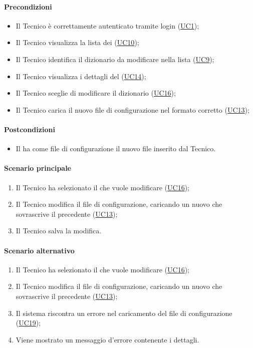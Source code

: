 \paragraph*{Precondizioni}
\begin{itemize}
  \item Il Tecnico è correttamente autenticato tramite login (\hyperref[UC1]{UC1});
  \item Il Tecnico visualizza la lista dei  (\hyperref[UC10]{UC10});
  \item Il Tecnico identifica il dizionario da modificare nella lista (\hyperref[UC9]{UC9});
  \item Il Tecnico visualizza i dettagli del  (\hyperref[UC14]{UC14});
  \item Il Tecnico sceglie di modificare il dizionario (\hyperref[UC16]{UC16});
  \item Il Tecnico carica il nuovo file di configurazione nel formato corretto (\hyperref[UC13]{UC13});
\end{itemize}

\paragraph*{Postcondizioni}
\begin{itemize}
  \item Il  ha come file di configurazione il nuovo file inserito dal Tecnico.
\end{itemize}

\paragraph*{Scenario principale}
\begin{enumerate}
  \item Il Tecnico ha selezionato il  che vuole modificare (\hyperref[UC16]{UC16});
  \item Il Tecnico modifica il file di configurazione, caricando un nuovo  che sovrascrive il precedente (\hyperref[UC13]{UC13});
  \item Il Tecnico salva la modifica.
\end{enumerate}

\paragraph*{Scenario alternativo}
\begin{enumerate}
  \item Il Tecnico ha selezionato il  che vuole modificare (\hyperref[UC16]{UC16});
  \item Il Tecnico modifica il file di configurazione, caricando un nuovo  che sovrascrive il precedente (\hyperref[UC13]{UC13});
  \item Il sistema riscontra un errore nel caricamento del file di configurazione (\hyperref[UC19]{UC19});
  \item Viene mostrato un messaggio d'errore contenente i dettagli.
\end{enumerate}


